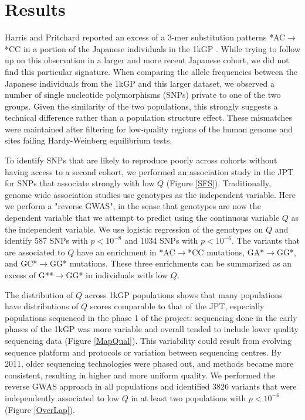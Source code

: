 \documentclass[
11pt, %
oneside, %
english, %
doublespacing, %
headsepline, %
]{MastersDoctoralThesis} %
\begin{document}
\section{Results}
Harris and Pritchard reported an excess of a 3-mer substitution patterns *AC${\rightarrow}$*CC in a portion of the Japanese individuals in the 1kGP \citep{Harris2017a}.
While trying to follow up on this observation in a larger and more recent Japanese cohort, we did not find this particular signature.
When comparing the allele frequencies between the Japanese individuals from the 1kGP and this larger dataset, we observed a number of single nucleotide polymorphisms (SNPs) private to one of the two groups.
Given the similarity of the two populations, this strongly suggests a technical difference rather than a population structure effect.
These mismatches were maintained after filtering for low-quality regions of the human genome and sites failing Hardy-Weinberg equilibrium tests.

To identify SNPs that are likely to reproduce poorly across cohorts without having access to a second cohort, we performed an association study in the JPT for SNPs that associate strongly with low $Q$ (Figure \ref{SFS}).
Traditionally, genome wide association studies use genotypes as the independent variable. 
Here we perform a "reverse GWAS", in the sense that genotypes are now the dependent variable that we attempt to predict using the continuous variable $Q$ as the independent variable.
We use logistic regression of the genotypes on $Q$ and identify 587 SNPs with $p < 10^{-8}$ and 1034 SNPs with $ p < 10^{-6}$.
The variants that are associated to $Q$ have an enrichment in *AC${\rightarrow}$*CC mutations, GA*${\rightarrow}$GG*, and GC*${\rightarrow}$GG* mutations.
These three enrichments can be summarized as an excess of G**${\rightarrow}$GG* in individuals with low $Q$.

The distribution of $Q$ across 1kGP populations shows that many populations have distributions of $Q$ scores comparable to that of the JPT, especially populations sequenced in the phase 1 of the project: sequencing done in the early phases of the 1kGP was more variable and overall tended to include lower quality sequencing data (Figure \ref{MapQual}).
This variability could result from evolving sequence platform and protocols or variation between sequencing centres. 
By 2011, older sequencing technologies were phased out, and methods became more consistent, resulting in higher and more uniform quality.
We performed the reverse GWAS approach in all populations and identified 3826 variants that were independently associated to low $Q$ in at least two populations with $ p < 10^{-6}$ (Figure \ref{OverLap}). 
\end{document}
